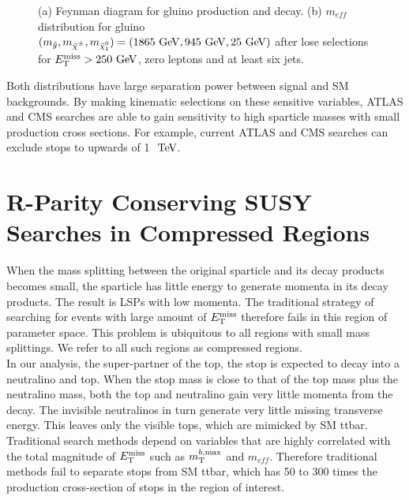 \begin{figure}[h!]
\begin{center}
\begin{subfigure}[b]{0.45\textwidth}
                \caption{ }
    \end{subfigure}
\caption[Gluino signal with large mass splittings and SM background $m_{eff}$ distribution after loose preliminary selections for $\met>250 \gev$, zero leptons and at least six jets]{ (a) Feynman diagram for gluino production and decay. (b) $m_{eff}$ distribution for gluino $(m_{\gluino}, m_{\chinopm}, m_{\ninoone}) = (1865 \gev, 945 \gev, 25 \gev)$ after lose selections for $\met>250 \gev$, zero leptons and at least six jets.\cite{SUSYinclusive0L} }
\end{center}
\label{fig:gluino_meff} 
\end{figure}

\indent Both distributions have large separation power between signal and SM backgrounds.  By making kinematic selections on these sensitive variables, ATLAS and CMS searches are able to gain sensitivity to high sparticle masses with small production cross sections.  For example, current ATLAS and CMS searches can exclude stops to upwards of 1 $\tev$. \\


\section{R-Parity Conserving SUSY Searches in Compressed Regions}


\indent When the mass splitting between the original sparticle and its decay products becomes small, the sparticle has little energy to generate momenta in its decay products.  The result is LSPs with low momenta.  The traditional strategy of searching for events with large amount of $E_{\mathrm{T}}^{\mathrm{miss}}$ therefore fails in this region of parameter space.  This problem is ubiquitous to all regions with small mass splittings.  We refer to all such regions as compressed regions.  ~\\

\indent  In our analysis, the super-partner of the top, the stop is expected to decay into a neutralino and top.  When the stop mass is close to that of the top mass plus the neutralino mass, both the top and neutralino gain very little momenta from the decay.  The invisible neutralinos in turn generate very little missing transverse energy.  This leaves only the visible tops, which are mimicked by SM ttbar. \\

\indent Traditional search methods depend on variables that are highly correlated with the total magnitude of $E_{\mathrm{T}}^{\mathrm{miss}}$ such as $m_{\mathrm{T}}^{b,\mathrm{max}}$ and $m_{eff}$.  Therefore traditional methods fail to separate stops from SM ttbar, which has 50 to 300 times the production cross-section of stops in the region of interest.  \\ %

